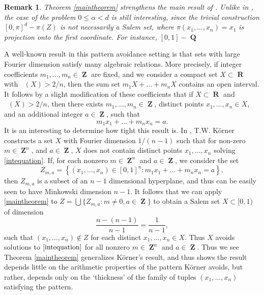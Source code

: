 \documentclass[12pt,reqno]{article}
\numberwithin{equation}{section}
\DeclareMathOperator{\fordim}{\dim_{\mathbf{F}}}
\DeclareMathOperator{\RR}{\mathbf{R}}
\DeclareMathOperator{\ZZ}{\mathbf{Z}}
\DeclareMathOperator{\QQ}{\mathbf{Q}}
\newtheorem*{remark}{Remark}
\begin{document}
\begin{remark}
    Theorem \ref{maintheorem} strengthens the main result of \cite{OurPaper}. Unlike in \cite{OurPaper}, the case of the problem $0 \leq \alpha < d$ is still interesting, since the trivial construction $[0,\pi]^d - \pi(Z)$ is not necessarily a Salem set, where $\pi(x_1, \dots, x_n) = x_1$ is projection onto the first coordinate. For instance, $[0,1] - \QQ$
\end{remark}

A well-known result in this pattern avoidance setting is that sets with large Fourier dimension satisfy many algebraic relations. More precisely, if integer coefficients $m_1, \dots, m_n \in \ZZ$ are fixed, and we consider a compact set $X \subset \RR$ with $\fordim(X) > 2/n$, then the sum set $m_1 X + \dots + m_n X$ contains an open interval. It follows by a slight modification of these coefficients that if $X \subset \RR$ and $\fordim(X) > 2/n$, then there exists $m_1, \dots, m_n \in \ZZ$, distinct points $x_1, \dots, x_n \in X$, and an additional integer $a \in \ZZ$, such that
%
\begin{equation} \label{intequation}
    m_1 x_1 + \dots + m_n x_n = a.
\end{equation}
%
It is an interesting to determine how tight this result is. In \cite{Korner2}, T.W. K\"{o}rner constructs a set $X$ with Fourier dimension $1/(n-1)$ such that for non-zero $m \in \ZZ^n$, and $a \in \ZZ$, $X$ does not contain distinct points $x_1, \dots, x_n$ solving \eqref{intequation}. If, for each nonzero $m \in \ZZ^n$ and $a \in \ZZ$, we consider the set
%
\[ Z_{m,a} = \left\{ (x_1, \dots, x_n) \in [0,1]^n : m_1x_1 + \dots + m_n x_n = a \right\}, \]
%
then $Z_{m,a}$ is a subset of an $n-1$ dimensional hyperplane, and thus can be easily seen to have Minkowski dimension $n-1$. It follows that we can apply \ref{maintheorem} to $Z = \bigcup \{ Z_{m,a} : m \neq 0, a \in \ZZ \}$ to obtain a Salem set $X \subset [0,1)$ of dimension
%
\[ \frac{n - (n-1)}{n - 1} = \frac{1}{n-1}, \]
%
such that $(x_1, \dots, x_n) \not \in Z$ for each distinct $x_1, \dots, x_n \in X$. Thus $X$ avoids solutions to $\eqref{intequation}$ for all nonzero $m \in \ZZ^n$ and $a \in \ZZ$. Thus we see Theorem \ref{maintheorem} generalizes K\"{o}rner's result, and thus shows the result depends little on the arithmetic properties of the pattern K\"{o}rner avoids, but rather, depends only on the `thickness' of the family of tuples $(x_1, \dots, x_n)$ satisfying the pattern.
\end{document}
